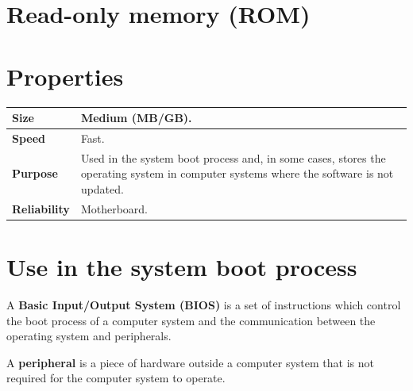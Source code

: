 \documentclass[a4paper]{systems-software}
\begin{document}
\newpage

\section{Read-only memory (ROM)}

\section*{Properties}

\begin{longtabu} to \textwidth {| X[1,l] | X[6,l] |}
    \hline
    \textbf{Size} & Medium (MB/GB).
	\\ \hline
	\textbf{Speed} & Fast.
	\\ \hline
	\textbf{Purpose} & Used in the system boot process and, in some cases, stores the operating system in computer systems where the software is not updated.
	\\ \hline
	\textbf{Reliability} & Motherboard.
	\\ \hline
\end{longtabu}


\section*{Use in the system boot process}

A \textbf{Basic Input/Output System (BIOS)} is a set of instructions which control the boot process of a computer system and the communication between the operating system and peripherals.

A \textbf{peripheral} is a piece of hardware outside a computer system that is not required for the computer system to operate.
\end{document}
